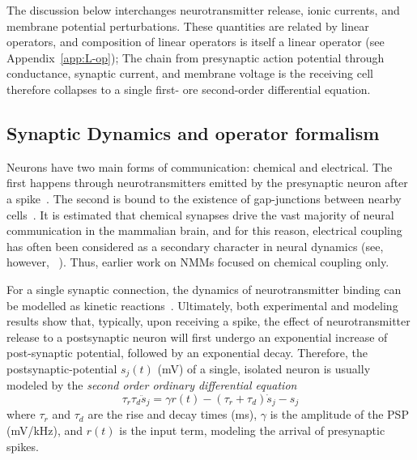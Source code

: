 \documentclass[12pt]{article}
\numberwithin{equation}{section}
\begin{document}
\begin{tcolorbox}[colback=gray!6,colframe=gray!6,enlarge left by=0mm,
  boxrule=0pt, enhanced, sharp corners]
The discussion below interchanges neurotransmitter release, ionic currents, and membrane potential perturbations. These quantities are related by linear operators, and composition of linear operators is itself a linear operator  (see Appendix~\ref{app:L-op}); 
The chain from presynaptic action potential through conductance, synaptic current, and membrane voltage is the receiving cell therefore collapses to a single first- ore second-order differential equation.
\end{tcolorbox}

\subsection{Synaptic Dynamics and operator formalism}\label{sec:synaptic-dynamics}
Neurons have two main forms of communication: chemical and electrical.
The first happens through neurotransmitters emitted by the presynaptic
neuron after a spike~\cite{hillis2020}.
The second is bound to the existence of gap-junctions between nearby cells~\cite{goodenough2009}.
It is estimated that chemical synapses drive the vast majority of
neural communication in the mammalian brain, and for this reason, electrical
coupling has often been considered as a secondary character in neural dynamics (see, however, ~\cite{pereda2014,alcami2019,vaughn2022}).
Thus, earlier work on NMMs focused on chemical coupling only. %

For a single synaptic connection, the dynamics of neurotransmitter binding
can be modelled as kinetic reactions~\cite{destexhe1994,Destexhe1998,dayan2001}.
Ultimately, both experimental and modeling results show that, typically, upon receiving a spike, the effect of neurotransmitter release to a postsynaptic neuron will first undergo an exponential increase of post-synaptic potential, followed by an exponential decay. 
Therefore, the postsynaptic-potential $s_j(t)$ (mV) of a single, isolated neuron
is usually modeled by the \textit{second order ordinary differential equation}~\cite{dayan2001,gerstner2014}
\begin{equation}\label{eq:synapses_single}
    \tau_r\tau_d\ddot s_j = \gamma r(t) - (\tau_r+\tau_d) \dot s_j -s_j
\end{equation}
where $\tau_r$ and $\tau_d$ are the rise and decay times (ms), $\gamma$ is the amplitude of the PSP (mV/kHz), and $r(t)$ is the input term, modeling the arrival of presynaptic spikes.
 
\end{document}
